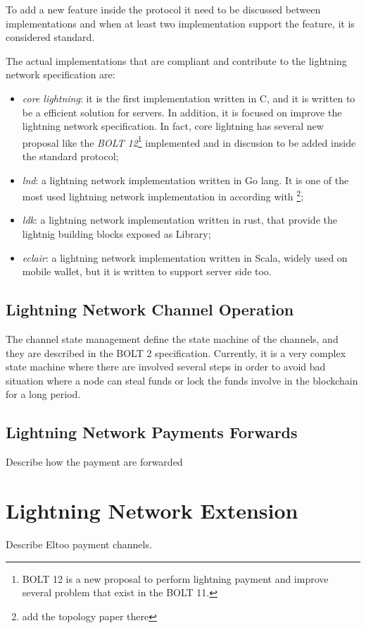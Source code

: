 To add a new feature inside the protocol it need to be discussed between implementations and when at least two implementation support the feature, it is considered standard.

The actual implementations that are compliant and contribute to the lightning network specification are:

\begin{itemize}
  \item \emph{core lightning}: it is the first implementation written in C, and it is written
        to be a efficient solution for servers. In addition, it is focused on improve the lightning network specification. In fact, core lightning has several new proposal like the \emph{BOLT 12}\footnote{BOLT 12 is a new proposal to perform
        lightning payment and improve several problem that exist in the BOLT 11.} implemented and in discusion to be
        added inside the standard protocol;
  \item \emph{lnd}: a lightning network implementation written in Go lang. It is one of the most used lightning network implementation in according with \footnote{add the topology paper there};
  \item \emph{ldk}: a lightning network implementation written in rust, that provide the lightnig building blocks exposed as Library;
  \item \emph{eclair}: a lightning network implementation written in Scala, widely used on mobile wallet, but it is written to
        support server side too.
\end{itemize}

\subsection{Lightning Network Channel Operation}
\label{sec:channel_state}

The channel state management define the state machine of the channels, and they are described in the BOLT 2 specification. Currently, it is a very complex
state machine where there are involved several steps in order to avoid bad
situation where a node can steal funds or lock the funds involve in the blockchain for a long period.

\subsection{Lightning Network Payments Forwards}

Describe how the payment are forwarded

\section{Lightning Network Extension}

Describe Eltoo\cite{eltoo} payment channels.
